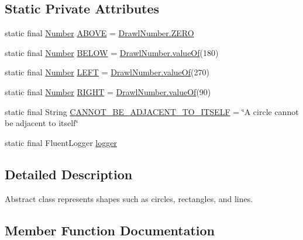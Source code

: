 \subsection*{Static Private Attributes}
\begin{DoxyCompactItemize}
\item 
static final \hyperlink{interfacecom_1_1aarrelaakso_1_1drawl_1_1_number}{Number} \hyperlink{classcom_1_1aarrelaakso_1_1drawl_1_1_shape_ac71780529ecfc46ae126d895d7735ac4}{A\+B\+O\+VE} = \hyperlink{classcom_1_1aarrelaakso_1_1drawl_1_1_drawl_number_ae79e88954ed30a7f939cc62836fdc75c}{Drawl\+Number.\+Z\+E\+RO}
\item 
static final \hyperlink{interfacecom_1_1aarrelaakso_1_1drawl_1_1_number}{Number} \hyperlink{classcom_1_1aarrelaakso_1_1drawl_1_1_shape_af670d34e6a0155ea0c350312d8ebc39f}{B\+E\+L\+OW} = \hyperlink{classcom_1_1aarrelaakso_1_1drawl_1_1_drawl_number_a368da87af7b1b38bd5185715afadcad6}{Drawl\+Number.\+value\+Of}(180)
\item 
static final \hyperlink{interfacecom_1_1aarrelaakso_1_1drawl_1_1_number}{Number} \hyperlink{classcom_1_1aarrelaakso_1_1drawl_1_1_shape_a682479373a5944ae84fc33fd65324e9d}{L\+E\+FT} = \hyperlink{classcom_1_1aarrelaakso_1_1drawl_1_1_drawl_number_a368da87af7b1b38bd5185715afadcad6}{Drawl\+Number.\+value\+Of}(270)
\item 
static final \hyperlink{interfacecom_1_1aarrelaakso_1_1drawl_1_1_number}{Number} \hyperlink{classcom_1_1aarrelaakso_1_1drawl_1_1_shape_ad4f620afc88ad5d6fadc698f443cbe38}{R\+I\+G\+HT} = \hyperlink{classcom_1_1aarrelaakso_1_1drawl_1_1_drawl_number_a368da87af7b1b38bd5185715afadcad6}{Drawl\+Number.\+value\+Of}(90)
\item 
static final String \hyperlink{classcom_1_1aarrelaakso_1_1drawl_1_1_shape_a82d5613ad2795e107346a68e48ae8379}{C\+A\+N\+N\+O\+T\+\_\+\+B\+E\+\_\+\+A\+D\+J\+A\+C\+E\+N\+T\+\_\+\+T\+O\+\_\+\+I\+T\+S\+E\+LF} = \char`\"{}A circle cannot be adjacent to itself\char`\"{}
\item 
static final Fluent\+Logger \hyperlink{classcom_1_1aarrelaakso_1_1drawl_1_1_shape_ab9ce64789a45acc1bdd2cee046264ff6}{logger}
\end{DoxyCompactItemize}


\subsection{Detailed Description}
Abstract class represents shapes such as circles, rectangles, and lines. 

\subsection{Member Function Documentation}
\mbox{\label{classcom_1_1aarrelaakso_1_1drawl_1_1_shape_ad2adcb85374cf5d6d59429628314e8d1}} 
